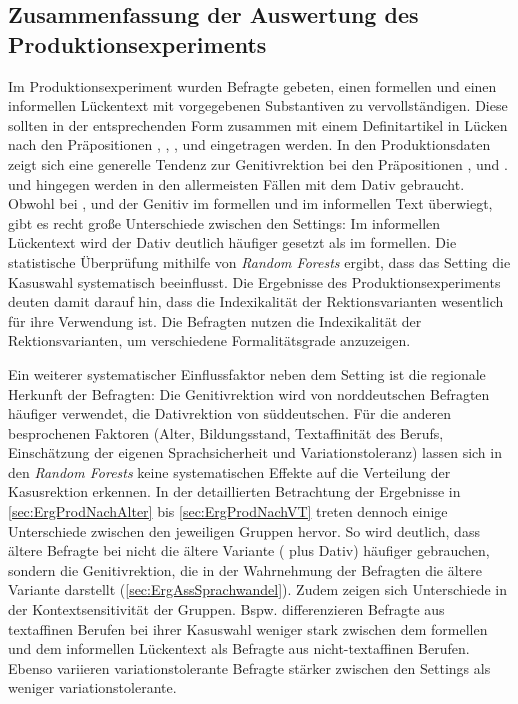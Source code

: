 \subsection{Zusammenfassung der Auswertung des Produktionsexperiments}
\label{sec:ErgProdZusammenfassung}
Im Produktionsexperiment wurden Befragte gebeten, einen formellen und einen informellen Lückentext mit vorgegebenen Substantiven zu vervollständigen. 
Diese sollten in der entsprechenden Form zusammen mit einem Definitartikel in Lücken nach den Präpositionen \wegen, \waehrend, \dank, \gegenueber{} und  eingetragen werden. 
In den Produktionsdaten zeigt sich eine generelle Tendenz zur Genitivrektion bei den Präpositionen \wegen, \waehrend{} und \dank{}. 
 und  hingegen werden in den allermeisten Fällen mit dem Dativ gebraucht. 
Obwohl bei \wegen, \waehrend{} und \dank{} der Genitiv im formellen und im informellen Text überwiegt, gibt es recht große Unterschiede zwischen den Settings: 
Im informellen Lückentext wird der Dativ deutlich häufiger gesetzt als im formellen. 
Die statistische Überprüfung mithilfe von \textit{Random Forests} ergibt, dass das Setting die Kasuswahl systematisch beeinflusst. 
Die Ergebnisse des Produktionsexperiments deuten damit darauf hin, dass die Indexikalität der Rektionsvarianten wesentlich für ihre Verwendung ist. 
Die Befragten nutzen die Indexikalität der Rektionsvarianten, um verschiedene Formalitätsgrade anzuzeigen. 

Ein weiterer systematischer Einflussfaktor neben dem Setting ist die regionale Herkunft der Befragten: 
Die Genitivrektion wird von norddeutschen Befragten häufiger verwendet, die Dativrektion von süddeutschen. 
Für die anderen besprochenen Faktoren (Alter, Bildungsstand, Textaffinität des Berufs, Einschätzung der eigenen Sprachsicherheit und Variationstoleranz) lassen sich in den \textit{Random Forests} keine systematischen Effekte auf die Verteilung der Kasusrektion erkennen. 
In der detaillierten Betrachtung der Ergebnisse in \autoref{sec:ErgProdNachAlter} bis \autoref{sec:ErgProdNachVT} treten dennoch einige Unterschiede zwischen den jeweiligen Gruppen hervor. 
So wird deutlich, dass ältere Befragte bei \dank{} nicht die ältere Variante (\dank{} plus Dativ) häufiger gebrauchen, sondern die Genitivrektion, die in der Wahrnehmung der Befragten die ältere Variante darstellt (\autoref{sec:ErgAssSprachwandel}). 
Zudem zeigen sich Unterschiede in der Kontextsensitivität der Gruppen. 
Bspw. differenzieren Befragte aus textaffinen Berufen bei ihrer Kasuswahl weniger stark zwischen dem formellen und dem informellen Lückentext als Befragte aus nicht-textaffinen Berufen.
Ebenso variieren variationstolerante Befragte stärker zwischen den Settings als weniger variationstolerante. 

